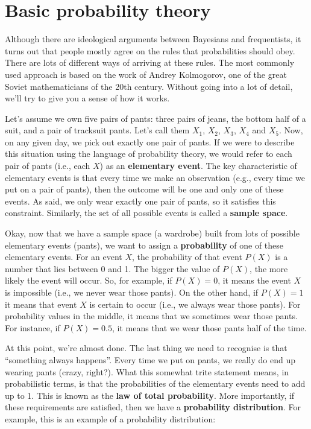 \documentclass[
]{book}
\theoremstyle{definition}
\theoremstyle{definition}
\theoremstyle{definition}
\theoremstyle{definition}
\theoremstyle{remark}
\begin{document}
\hypertarget{basicprobability}{%
\section{Basic probability theory}\label{basicprobability}}

Although there are ideological arguments between Bayesians and frequentists, it turns out that people mostly agree on the rules that probabilities should obey. There are lots of different ways of arriving at these rules. The most commonly used approach is based on the work of Andrey Kolmogorov, one of the great Soviet mathematicians of the 20th century. Without going into a lot of detail, we'll try to give you a sense of how it works.

Let's assume we own five pairs of pants: three pairs of jeans, the bottom half of a suit, and a pair of tracksuit pants. Let's call them \(X_1\), \(X_2\), \(X_3\), \(X_4\) and \(X_5\). Now, on any given day, we pick out exactly one pair of pants. If we were to describe this situation using the language of probability theory, we would refer to each pair of pants (i.e., each \(X\)) as an \textbf{elementary event}. The key characteristic of elementary events is that every time we make an observation (e.g., every time we put on a pair of pants), then the outcome will be one and only one of these events. As said, we only wear exactly one pair of pants, so it satisfies this constraint. Similarly, the set of all possible events is called a \textbf{sample space}.

Okay, now that we have a sample space (a wardrobe) built from lots of possible elementary events (pants), we want to assign a \textbf{probability} of one of these elementary events. For an event \(X\), the probability of that event \(P(X)\) is a number that lies between 0 and 1. The bigger the value of \(P(X)\), the more likely the event will occur. So, for example, if \(P(X) = 0\), it means the event \(X\) is impossible (i.e., we never wear those pants). On the other hand, if \(P(X) = 1\) it means that event \(X\) is certain to occur (i.e., we always wear those pants). For probability values in the middle, it means that we sometimes wear those pants. For instance, if \(P(X) = 0.5\), it means that we wear those pants half of the time.

At this point, we're almost done. The last thing we need to recognise is that ``something always happens''. Every time we put on pants, we really do end up wearing pants (crazy, right?). What this somewhat trite statement means, in probabilistic terms, is that the probabilities of the elementary events need to add up to 1. This is known as the \textbf{law of total probability}. More importantly, if these requirements are satisfied, then we have a \textbf{probability distribution}. For example, this is an example of a probability distribution:
\end{document}

